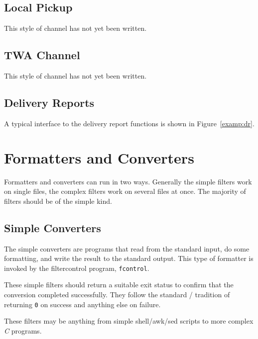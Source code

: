 \subsection {Local Pickup}

This style of channel has not yet been written.

\subsection {TWA Channel}

This style of channel has not yet been written.

\subsection {Delivery Reports}

A typical interface to the delivery report functions is shown in 
Figure~\ref{examp:dr}.


\section {Formatters and Converters}


Formatters and converters can run in two ways. Generally the simple
filters work on single files, the complex filters work on several
files at once. The majority of filters should be of the simple kind.

\subsection{Simple Converters}

The simple converters are programs that read from the standard input,
do some formatting, and write the result to the standard output.
This type of formatter is invoked by the filtercontrol program,
\verb|fcontrol|.

These simple filters should return a suitable exit status to confirm
that the conversion completed successfully. They follow the standard
\unix/ tradition of returning \verb|0| on success and anything else on
failure. 

These filters may be anything from simple shell/awk/sed scripts to
more complex {\em C} programs.

